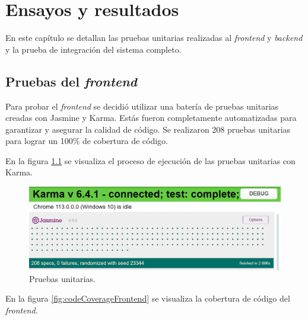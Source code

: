 
\chapter{Ensayos y resultados} %

\label{Chapter4} %

En este capítulo se detallan las pruebas unitarias realizadas al \textit{frontend} y \textit{backend} y la prueba de integración del sistema completo.


\section{Pruebas del \emph{frontend}}

Para probar el \textit{frontend} se decidió utilizar una batería de pruebas unitarias \citep{WEBSITE:UNITTESTING} creadas con Jasmine y Karma. Estás fueron completamente automatizadas para garantizar y asegurar la calidad de código. Se realizaron 208 pruebas unitarias para lograr un 100\% de cobertura de código.

En la figura \ref{fig:unitTestingFrontend} se visualiza el proceso de ejecución de las pruebas unitarias con Karma.

\begin{figure}[H]
	\centering
	\includegraphics[width=.9\textwidth]{./Figures/Frontend unit testing.png}
	\caption{Pruebas unitarias.}
	\label{fig:unitTestingFrontend}
\end{figure}

En la figura \ref{fig:codeCoverageFrontend} se visualiza la cobertura de código del \emph{frontend}.

